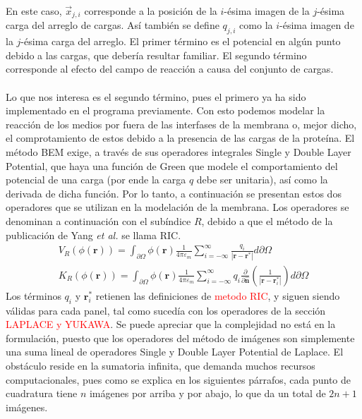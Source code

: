 \documentclass[12pt, oneside, numbers, spanish]{ezthesis}
\numberwithin{equation}{section}
\begin{document}
En este caso, $\vec{x}_{j,i}$ corresponde a la posición de la $i$-ésima imagen de la $j$-ésima carga del arreglo de cargas. Así también se define $q_{j,i}$ como la $i$-ésima imagen de la $j$-ésima carga del arreglo. El primer término es el potencial en algún punto debido a las cargas, que debería resultar familiar. El segundo término corresponde al efecto del campo de reacción a causa del conjunto de cargas.\\\\
Lo que nos interesa es el segundo término, pues el primero ya ha sido implementado en el programa previamente. Con esto podemos modelar la reacción de los medios por fuera de las interfases de la membrana o, mejor dicho, el comprotamiento de estos debido a la presencia de las cargas de la proteína. El método BEM exige, a través de sus operadores integrales Single y Double Layer Potential, que haya una función de Green que modele el comportamiento del potencial de una carga (por ende la carga $q$ debe ser unitaria), así como la derivada de dicha función. Por lo tanto, a continuación se presentan estos dos operadores que se utilizan en la modelación de la membrana. Los operadores se denominan a continuación con el subíndice $R$, debido a que el método de la publicación de Yang \textit{et al.} se llama RIC.
\begin{align}
V_R(\phi(\mathbf{r})) = \int_{\partial\Omega}\phi(\mathbf{r})\frac{1}{4\pi\varepsilon_m}\sum_{i=-\infty}^{\infty}\frac{q_i}{|\mathbf{r} - \mathbf{r}^*|}d\partial\Omega\\
K_R(\phi(\mathbf{r})) = \int_{\partial\Omega}\phi(\mathbf{r})\frac{1}{4\pi\varepsilon_m}\sum_{i=-\infty}^{\infty}q_i\frac{\partial}{\partial\hat{\mathbf{n}}}\left(\frac{1}{|\mathbf{r} - \mathbf{r}_i^*|}\right)d\partial\Omega
\end{align}
Los términos $q_i$ y $\mathbf{r}_i^*$ retienen las definiciones de \textcolor{red}{metodo RIC}, y siguen siendo válidas para cada panel, tal como sucedía con los operadores de la sección \textcolor{red}{LAPLACE y YUKAWA}. Se puede apreciar que la complejidad no está en la formulación, puesto que los operadores del método de imágenes son simplemente una suma lineal de operadores Single y Double Layer Potential de Laplace. El obstáculo reside en la sumatoria infinita, que demanda muchos recursos computacionales, pues como se explica en los siguientes párrafos, cada punto de cuadratura tiene $n$ imágenes por arriba y por abajo, lo que da un total de $2n + 1$ imágenes.
\end{document}

